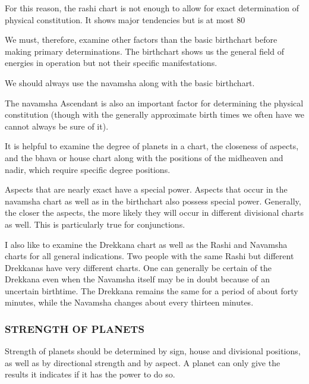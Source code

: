  

For this reason, the rashi chart is not enough to allow for exact determination of physical constitution. It shows major tendencies but is at most 80%
 

We must, therefore, examine other factors than the basic birthchart before making primary determinations. The birthchart shows us the general field of energies in operation but not their specific manifestations.

 

We should always use the navamsha along with the basic birthchart.
 

The navamsha Ascendant is also an important factor for determining the physical constitution (though with the generally approximate birth times we often have we cannot always be sure of it).

 

It is helpful to examine the degree of planets in a chart, the closeness of aspects, and the bhava or house chart along with the positions of the midheaven and nadir, which require specific degree positions.
 

Aspects that are nearly exact have a special power. Aspects that occur in the navamsha chart as well as in the birthchart also possess special power. Generally, the closer the aspects, the more likely they will occur in different divisional charts as well.  This is particularly true for conjunctions.

 

I also like to examine the Drekkana chart as well as the Rashi and Navamsha charts for all general indications. Two people with the same Rashi but different Drekkanas have very different charts. One can generally be certain of the Drekkana even when the Navamsha itself may be in doubt because of an uncertain birthtime. The Drekkana remains the same for a period of about forty minutes, while the Navamsha changes about every thirteen minutes.
 

\subsubsection{STRENGTH OF PLANETS}

 

Strength of planets should be determined by sign, house and divisional positions, as well as by directional strength and by aspect. A planet can only give the results it indicates if it has the power to do so.

 

